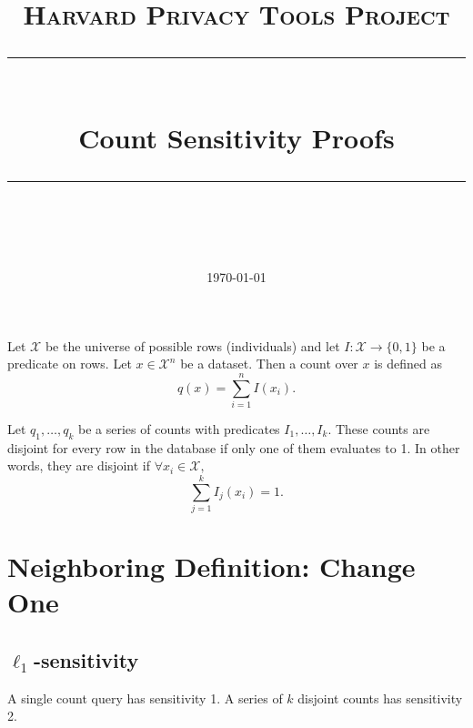 \documentclass[11pt]{scrartcl} %
\title{
	\normalfont\normalsize
	\textsc{Harvard Privacy Tools Project}\\ %
	\vspace{25pt} %
	\rule{\linewidth}{0.5pt}\\ %
	\vspace{20pt} %
	{\huge Count Sensitivity Proofs}\\ %
	\vspace{12pt} %
	\rule{\linewidth}{2pt}\\ %
	\vspace{12pt} %
}
\date{\normalsize\today} %
\begin{document}
\maketitle

\begin{definition}
Let $\mathcal{X}$ be the universe of possible rows (individuals) and let $I: \mathcal{X} \rightarrow \{0,1\}$ be a predicate on rows. Let $x \in \mathcal{X}^n$ be a dataset. Then a count over $x$ is defined as 
$$ q(x) = \sum_{i=1}^n I(x_i).$$
\end{definition}

\begin{definition}
Let $q_1, \ldots, q_k$ be a series of counts with predicates $I_1, \ldots, I_k$. These counts are disjoint for every row in the database if only one of them evaluates to 1. In other words, they are disjoint if $\forall x_i \in \mathcal{X},$ 
$$ \sum_{j=1}^k I_j(x_i) = 1.$$
\end{definition}

\section{Neighboring Definition: Change One}

\subsection{$\ell_1$-sensitivity}

\begin{theorem}
\label{thm:change1L1}
A single count query has sensitivity 1. A series of $k$ disjoint counts has sensitivity 2.
\end{theorem}
\end{document}
